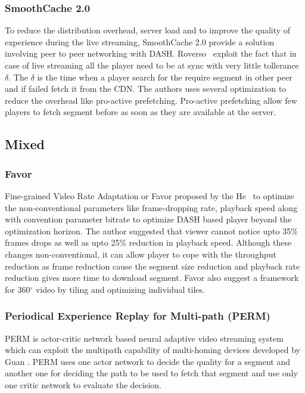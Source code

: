 \subsubsection{SmoothCache 2.0}
To reduce the distribution overhead, server load and to improve the quality of experience during the live streaming, SmoothCache 2.0\cite{10.1145/2713168.2713182} provide a solution involving peer to peer networking with DASH. Roverso \etal\ exploit the fact that in case of live streaming all the player need to be at sync with very little tollerance $\delta$. The $\delta$ is the time when a player search for the require segment in other peer and if failed fetch it from the CDN. The authors uses several optimization to reduce the overhead like pro-active prefetching. Pro-active prefetching allow few players to fetch segment before as soon as they are available at the server. 

\subsection{Mixed}



\subsubsection{Favor}
Fine-grained Video Rate Adaptation or Favor\cite{10.1145/3204949.3204957} proposed by the He \etal\ to optimize the non-conventional parameters like frame-dropping rate, playback speed along with convention parameter bitrate to optimize DASH based player beyond the optimization horizon. The author suggested that viewer cannot notice upto 35\% frames drops as well as upto 25\% reduction in playback speed. Although these changes non-conventional, it can allow player to cope with the throughput reduction as frame reduction cause the segment size reduction and playback rate reduction gives more time to download segment. Favor also suggest a framework for 360$^{\circ}$ video by tiling and optimizing individual tiles.


\subsubsection{Periodical Experience Replay for Multi-path (PERM)}
PERM\cite{9155492} is actor-critic network based neural adaptive video streaming system which can exploit the multipath capability of multi-homing devices developed by Guan \etal. PERM uses one actor network to decide the quality for a segment and another one for deciding the path to be used to fetch that segment and use only one critic network to evaluate the decision.

